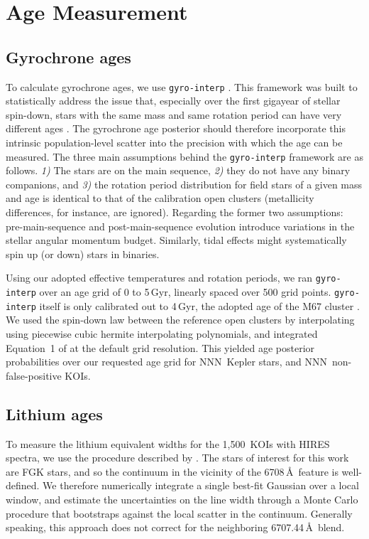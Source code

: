 \documentclass[11pt,twocolumn,tighten]{aastex63}
\newcommand{\nkoiswithhires}{{1{,}500}}
\newcommand{\nkepstarswithages}{NNN}
\newcommand{\nkoisnofpwithages}{NNN}
\begin{document}



\section{Age Measurement}
\label{sec:agemethod}

\subsection{Gyrochrone ages}
To calculate gyrochrone ages, we use \texttt{gyro-interp}
\citep{Bouma_2023}.  This framework was built to statistically address
the issue that, especially over the first gigayear of stellar
spin-down, stars with the same mass and same rotation period can have
very different ages \citep[e.g.][]{Curtis_2019_ngc6811}.  The
gyrochrone age posterior should therefore incorporate this intrinsic
population-level scatter into the precision with which the age can be
measured.  The three main assumptions behind the \texttt{gyro-interp}
framework are as follows.  {\it 1)} The stars are on the main
sequence, {\it 2)} they do not have any binary companions,
and {\it 3)} the rotation period distribution
for field stars of a given mass and age is identical to that of
the calibration open clusters (metallicity differences, for instance, are
ignored).  
Regarding the former two assumptions:
pre-main-sequence and post-main-sequence evolution introduce
variations in the stellar angular momentum budget.  Similarly, tidal
effects might systematically spin up (or down) stars in binaries.

Using our adopted effective temperatures and rotation periods, we ran 
\texttt{gyro-interp} over an age grid of 0 to 5\,Gyr, linearly spaced
over 500 grid points.
\texttt{gyro-interp} itself is only calibrated out to 4\,Gyr, the
adopted age of the M67 cluster \citep[see][]{Dungee_2022,Gruner_2023}.
We used the spin-down law between the reference open clusters by
interpolating using piecewise cubic hermite interpolating polynomials,
and integrated Equation~1 of \citep{Bouma_2023} at the default grid
resolution.
This yielded age posterior probabilities over our requested age grid
for \nkepstarswithages\ Kepler stars, and \nkoisnofpwithages\
non-false-positive KOIs.


\subsection{Lithium ages}
To measure the lithium equivalent widths for the \nkoiswithhires\ KOIs
with HIRES spectra, we use the procedure described by
\citet{Bouma_2021}.
The stars of interest for this work are FGK stars, and so the
continuum in the vicinity of the
 6708\,\AA\ feature is well-defined.
We therefore numerically integrate a single best-fit Gaussian over a
local window, and estimate the uncertainties on the line width through
a Monte Carlo procedure that bootstraps against the local scatter in the
continuum.
Generally speaking, this approach does not correct for the neighboring
\ion{Fe}{1} 6707.44\,\AA\ blend.
\end{document}

